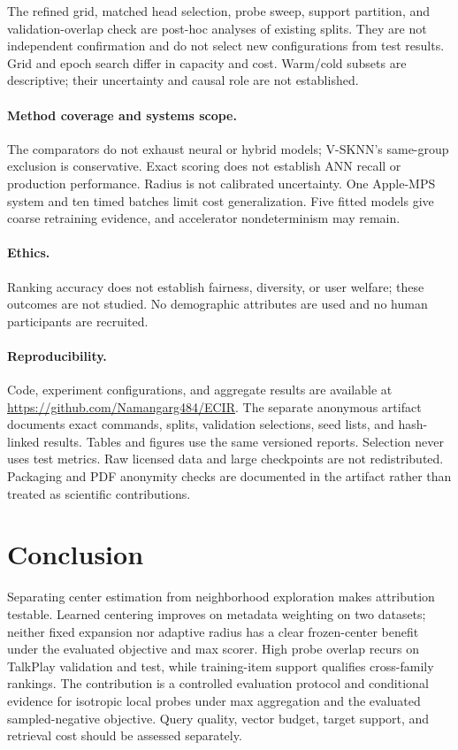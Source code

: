 \documentclass[runningheads]{llncs}
\begin{document}
The refined grid, matched head selection, probe sweep, support partition, and
validation-overlap check are post-hoc analyses of existing splits. They are
not independent confirmation and do not select new configurations from test
results. Grid and epoch search differ in capacity and cost. Warm/cold subsets
are descriptive; their uncertainty and causal role are not established.

\paragraph{Method coverage and systems scope.}
The comparators do not exhaust neural or hybrid models; V-SKNN's same-group
exclusion is conservative. Exact scoring does not establish ANN recall or
production performance. Radius is not calibrated uncertainty. One Apple-MPS
system and ten timed batches limit cost generalization. Five fitted models
give coarse retraining evidence, and accelerator nondeterminism may remain.

\paragraph{Ethics.}
Ranking accuracy does not establish fairness, diversity, or user welfare;
these outcomes are not studied. No demographic attributes are used and no
human participants are recruited.

\paragraph{Reproducibility.}
Code, experiment configurations, and aggregate results are available at
\url{https://github.com/Namangarg484/ECIR}.
The separate anonymous artifact documents exact commands, splits, validation selections,
seed lists, and hash-linked results. Tables and figures use the same versioned
reports. Selection never uses test metrics. Raw licensed data and large
checkpoints are not redistributed. Packaging and PDF anonymity checks are
documented in the artifact rather than treated as scientific contributions.

\section{Conclusion}
\label{sec:conclusion}

Separating center estimation from neighborhood exploration makes attribution
testable. Learned centering improves on metadata weighting on two datasets;
neither fixed expansion nor adaptive radius has a clear frozen-center benefit
under the evaluated objective and max scorer. High probe overlap recurs on
TalkPlay validation and test, while training-item support qualifies cross-family
rankings. The contribution is a controlled evaluation protocol and conditional
evidence for isotropic local probes under max aggregation and the evaluated
sampled-negative objective. Query quality, vector budget, target support, and
retrieval cost should be assessed separately.
\end{document}
